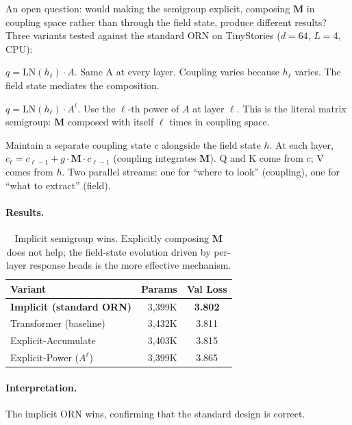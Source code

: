 \documentclass[11pt, a4paper]{article}
\newcommand{\M}{\mathbf{M}}
\theoremstyle{plain}
\theoremstyle{remark}
\begin{document}
An open question: would making the semigroup explicit, composing $\M$ in coupling space rather than through the field state, produce different results?
Three variants tested against the standard ORN on TinyStories ($d{=}64$, $L{=}4$, CPU):

\begin{description}[nosep, leftmargin=1.5em]
    \item[Implicit (standard ORN):] $q = \text{LN}(h_\ell) \cdot A$. Same A at every layer. Coupling varies because $h_\ell$ varies. The field state mediates the composition.

    \item[Explicit-Power:] $q = \text{LN}(h_\ell) \cdot A^\ell$. Use the $\ell$-th power of $A$ at layer $\ell$. This is the literal matrix semigroup: $\M$ composed with itself $\ell$ times in coupling space.

    \item[Explicit-Accumulate:] Maintain a separate coupling state $c$ alongside the field state $h$. At each layer, $c_\ell = c_{\ell-1} + g \cdot \M \cdot c_{\ell-1}$ (coupling integrates $\M$). Q and K come from $c$; V comes from $h$. Two parallel streams: one for ``where to look'' (coupling), one for ``what to extract'' (field).
\end{description}

\paragraph{Results.}

\begin{table}[h]
\centering\small
\begin{tabular}{@{}lrc@{}}
\toprule
\textbf{Variant} & \textbf{Params} & \textbf{Val Loss} \\
\midrule
\textbf{Implicit (standard ORN)} & 3,399K & \textbf{3.802} \\
Transformer (baseline) & 3,432K & 3.811 \\
Explicit-Accumulate & 3,403K & 3.815 \\
Explicit-Power ($A^\ell$) & 3,399K & 3.865 \\
\bottomrule
\end{tabular}
\caption{Implicit semigroup wins. Explicitly composing $\M$ does not help; the field-state evolution driven by per-layer response heads is the more effective mechanism.}
\end{table}

\paragraph{Interpretation.}
The implicit ORN wins, confirming that the standard design is correct.
\end{document}
